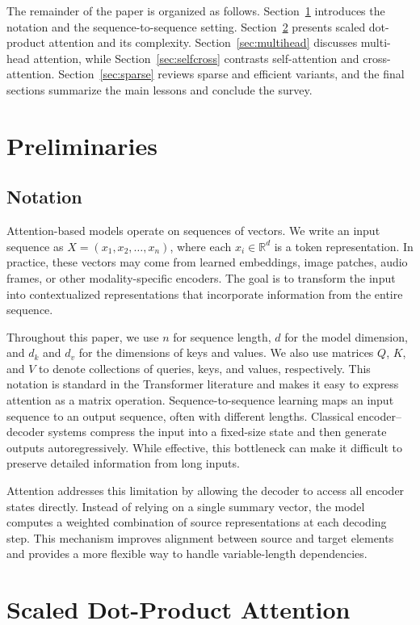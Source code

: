 \documentclass[a4paper,11pt]{article}
\begin{document}
The remainder of the paper is organized as follows. Section~\ref{sec:preliminaries} introduces the notation and the sequence-to-sequence setting. Section~\ref{sec:scaled} presents scaled dot-product attention and its complexity. Section~\ref{sec:multihead} discusses multi-head attention, while Section~\ref{sec:selfcross} contrasts self-attention and cross-attention. Section~\ref{sec:sparse} reviews sparse and efficient variants, and the final sections summarize the main lessons and conclude the survey.
\section{Preliminaries}\label{sec:preliminaries}
\subsection{Notation}


Attention-based models operate on sequences of vectors. We write an input sequence as $X = (x_1, x_2, \dots, x_n)$, where each $x_i \in \mathbb{R}^d$ is a token representation. In practice, these vectors may come from learned embeddings, image patches, audio frames, or other modality-specific encoders. The goal is to transform the input into contextualized representations that incorporate information from the entire sequence.

Throughout this paper, we use $n$ for sequence length, $d$ for the model dimension, and $d_k$ and $d_v$ for the dimensions of keys and values. We also use matrices $Q$, $K$, and $V$ to denote collections of queries, keys, and values, respectively. This notation is standard in the Transformer literature and makes it easy to express attention as a matrix operation.
Sequence-to-sequence learning maps an input sequence to an output sequence, often with different lengths. Classical encoder--decoder systems compress the input into a fixed-size state and then generate outputs autoregressively. While effective, this bottleneck can make it difficult to preserve detailed information from long inputs.

Attention addresses this limitation by allowing the decoder to access all encoder states directly. Instead of relying on a single summary vector, the model computes a weighted combination of source representations at each decoding step. This mechanism improves alignment between source and target elements and provides a more flexible way to handle variable-length dependencies.
\section{Scaled Dot-Product Attention}\label{sec:scaled}
\end{document}

